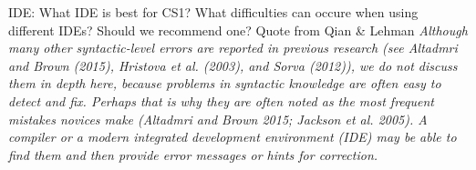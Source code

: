 IDE: What IDE is best for CS1? What difficulties can occure when using different IDEs? Should we recommend one? Quote from Qian \& Lehman \emph{Although many other syntactic-level errors are reported in previous research (see Altadmri and Brown (2015), Hristova et al. (2003), and Sorva (2012)), we do not discuss them in depth here, because problems in syntactic knowledge are often easy to detect and fix. Perhaps that is why they are often noted as the most frequent mistakes novices make (Altadmri and Brown 2015; Jackson et al. 2005). A compiler or a modern integrated development environment (IDE) may be able to find them and then provide error messages or hints for correction.}

